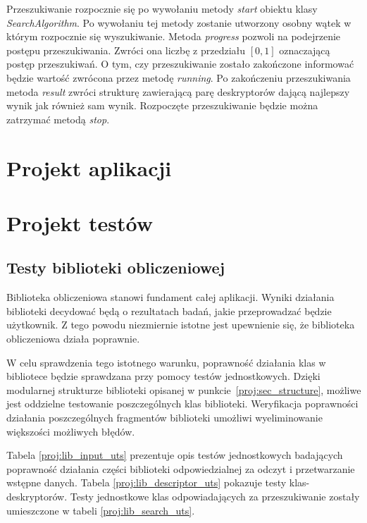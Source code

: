 \documentclass[../thesis.tex]{subfiles}
\begin{document}
Przeszukiwanie rozpocznie się po wywołaniu metody \emph{start} obiektu klasy \emph{SearchAlgorithm}. Po wywołaniu tej metody zostanie utworzony osobny wątek w którym rozpocznie się wyszukiwanie. Metoda \emph{progress} pozwoli na podejrzenie postępu przeszukiwania. Zwróci ona liczbę z przedziału $[0, 1]$ oznaczającą postęp przeszukiwań. O tym, czy przeszukiwanie zostało zakończone informować będzie wartość zwrócona przez metodę \emph{running}. Po zakończeniu przeszukiwania metoda \emph{result} zwróci strukturę zawierającą parę deskryptorów dającą najlepszy wynik jak również sam wynik. Rozpoczęte przeszukiwanie będzie można zatrzymać metodą \emph{stop}.

\section{Projekt aplikacji}
\section{Projekt testów}

\subsection{Testy biblioteki obliczeniowej}

Biblioteka obliczeniowa stanowi fundament całej aplikacji. Wyniki działania biblioteki decydować będą o rezultatach badań, jakie przeprowadzać będzie użytkownik. Z tego powodu niezmiernie istotne jest upewnienie się, że biblioteka obliczeniowa działa poprawnie. 

W celu sprawdzenia tego istotnego warunku, poprawność działania klas w bibliotece będzie sprawdzana przy pomocy testów jednostkowych. Dzięki modularnej strukturze biblioteki opisanej w punkcie~\ref{proj:sec_structure}, możliwe jest oddzielne testowanie poszczególnych klas biblioteki. Weryfikacja poprawności działania poszczególnych fragmentów biblioteki umożliwi wyeliminowanie większości możliwych błędów.

Tabela \ref{proj:lib_input_uts} prezentuje opis testów jednostkowych badających poprawność działania części biblioteki odpowiedzialnej za odczyt i przetwarzanie wstępne danych. Tabela \ref{proj:lib_descriptor_uts} pokazuje testy klas-deskryptorów. Testy jednostkowe klas odpowiadających za przeszukiwanie zostały umieszczone w tabeli \ref{proj:lib_search_uts}.
\end{document}
